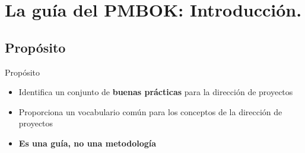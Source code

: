 \section{La guía del PMBOK: Introducción.}

\subsection{Propósito}
\begin{frame}{Propósito}
	
	\begin{itemize}
		\item{Identifica un conjunto de \textbf{buenas prácticas} para la dirección de proyectos}
		\item{Proporciona un vocabulario común para los conceptos de la dirección de proyectos}
		\item{\textbf{Es una guía, no una metodología}}
	\end{itemize}
\end{frame}

